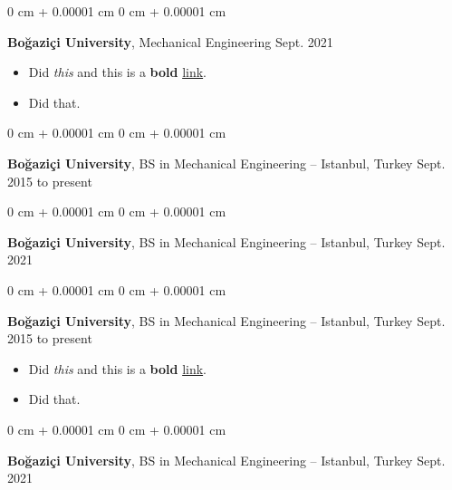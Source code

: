 \documentclass[10pt, letterpaper]{article}
\newenvironment{highlights}{
    \begin{itemize}[
        topsep=0.10 cm,
        parsep=0.10 cm,
        partopsep=0pt,
        itemsep=0pt,
        leftmargin=0 cm + 10pt
    ]
}{
    \end{itemize}
        
    \vspace{-0.20cm}
} %
\newenvironment{onecolentry}{
    \begin{adjustwidth}{
        0 cm + 0.00001 cm
    }{
        0 cm + 0.00001 cm
    }
}{
    \end{adjustwidth}
} %
\begin{document}
        \vspace{0.1 cm}

        \begin{onecolentry}
            \textbf{Boğaziçi University}, Mechanical Engineering \hfill Sept. 2021
            \begin{highlights}
                \item Did \textit{this} and this is a \textbf{bold} \href{https://example.com}{link}.
                \item Did that.
            \end{highlights}
        \end{onecolentry}

        \vspace{0.1 cm}

        \begin{onecolentry}
            \textbf{Boğaziçi University}, BS in Mechanical Engineering -- Istanbul, Turkey \hfill Sept. 2015 to present
        \end{onecolentry}

        \vspace{0.1 cm}

        \begin{onecolentry}
            \textbf{Boğaziçi University}, BS in Mechanical Engineering -- Istanbul, Turkey \hfill Sept. 2021
        \end{onecolentry}

        \vspace{0.1 cm}

        \begin{onecolentry}
            \textbf{Boğaziçi University}, BS in Mechanical Engineering -- Istanbul, Turkey \hfill Sept. 2015 to present
            \begin{highlights}
                \item Did \textit{this} and this is a \textbf{bold} \href{https://example.com}{link}.
                \item Did that.
            \end{highlights}
        \end{onecolentry}

        \vspace{0.1 cm}

        \begin{onecolentry}
            \textbf{Boğaziçi University}, BS in Mechanical Engineering -- Istanbul, Turkey \hfill Sept. 2021
        \end{onecolentry}
\end{document}
